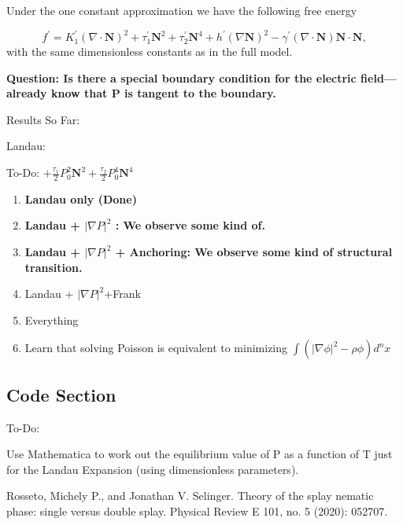 \documentclass[oneside,english]{amsart}
\numberwithin{equation}{section}
\numberwithin{figure}{section}
\begin{document}
Under the one constant approximation we have the following free energy

\[
f^{\prime}=K_{1}^{\prime}\left(\nabla\cdot\mathbf{N}\right)^{2}+\tau_{1}^{\prime}\mathbf{N}^{2}+\tau_{2}^{\prime}\mathbf{N}^{4}+h^{\prime}\left(\nabla\mathbf{N}\right)^{2}-\gamma^{\prime}\left(\nabla\cdot\mathbf{N}\right)\mathbf{N}\cdot\mathbf{N},
\]
with the same dimensionless constants as in the full model.

\textbf{Question: Is there a special boundary condition for the electric
field---already know that P is tangent to the boundary.}

Results So Far:

Landau:

To-Do: $+\frac{\tau_{1}}{2}P_{0}^{2}\mathbf{N}^{2}+\frac{\tau_{2}}{2}P_{0}^{4}\mathbf{N}^{4}$
\begin{enumerate}
\item \textbf{Landau only (Done)}
\item \textbf{Landau + $|\nabla P|^{2}$ : We observe some kind of.}
\item \textbf{Landau + $|\nabla P|^{2}$ + Anchoring: We observe some kind
of structural transition.}
\item Landau + $|\nabla P|^{2}$+Frank
\item Everything
\item Learn that solving Poisson is equivalent to minimizing $\int\left(\left|\nabla\phi\right|^{2}-\rho\phi\right)d^{n}x$
\end{enumerate}

\subsection{Code Section}

To-Do:

Use Mathematica to work out the equilibrium value of P as a function
of T just for the Landau Expansion (using dimensionless parameters).
\begin{thebibliography}{1}
Rosseto, Michely P., and Jonathan V. Selinger. \textquotedbl Theory
of the splay nematic phase: single versus double splay.\textquotedbl{}
Physical Review E 101, no. 5 (2020): 052707.

\end{thebibliography}
\end{document}

